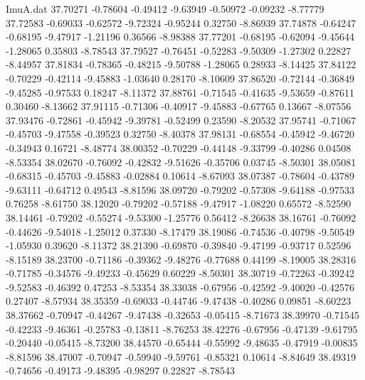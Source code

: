 \begin{filecontents}{ImuA.dat}
  37.70271   -0.78604   -0.49412   -9.63949   -0.50972   -0.09232   -8.77779
  37.72583   -0.69033   -0.62572   -9.72324   -0.95244    0.32750   -8.86939
  37.74878   -0.64247   -0.68195   -9.47917   -1.21196    0.36566   -8.98388
  37.77201   -0.68195   -0.62094   -9.45644   -1.28065    0.35803   -8.78543
  37.79527   -0.76451   -0.52283   -9.50309   -1.27302    0.22827   -8.44957
  37.81834   -0.78365   -0.48215   -9.50788   -1.28065    0.28933   -8.14425
  37.84122   -0.70229   -0.42114   -9.45883   -1.03640    0.28170   -8.10609
  37.86520   -0.72144   -0.36849   -9.45285   -0.97533    0.18247   -8.11372
  37.88761   -0.71545   -0.41635   -9.53659   -0.87611    0.30460   -8.13662
  37.91115   -0.71306   -0.40917   -9.45883   -0.67765    0.13667   -8.07556
  37.93476   -0.72861   -0.45942   -9.39781   -0.52499    0.23590   -8.20532
  37.95741   -0.71067   -0.45703   -9.47558   -0.39523    0.32750   -8.40378
  37.98131   -0.68554   -0.45942   -9.46720   -0.34943    0.16721   -8.48774
  38.00352   -0.70229   -0.44148   -9.33799   -0.40286    0.04508   -8.53354
  38.02670   -0.76092   -0.42832   -9.51626   -0.35706    0.03745   -8.50301
  38.05081   -0.68315   -0.45703   -9.45883   -0.02884    0.10614   -8.67093
  38.07387   -0.78604   -0.43789   -9.63111   -0.64712    0.49543   -8.81596
  38.09720   -0.79202   -0.57308   -9.64188   -0.97533    0.76258   -8.61750
  38.12020   -0.79202   -0.57188   -9.47917   -1.08220    0.65572   -8.52590
  38.14461   -0.79202   -0.55274   -9.53300   -1.25776    0.56412   -8.26638
  38.16761   -0.76092   -0.44626   -9.54018   -1.25012    0.37330   -8.17479
  38.19086   -0.74536   -0.40798   -9.50549   -1.05930    0.39620   -8.11372
  38.21390   -0.69870   -0.39840   -9.47199   -0.93717    0.52596   -8.15189
  38.23700   -0.71186   -0.39362   -9.48276   -0.77688    0.44199   -8.19005
  38.28316   -0.71785   -0.34576   -9.49233   -0.45629    0.60229   -8.50301
  38.30719   -0.72263   -0.39242   -9.52583   -0.46392    0.47253   -8.53354
  38.33038   -0.67956   -0.42592   -9.40020   -0.42576    0.27407   -8.57934
  38.35359   -0.69033   -0.44746   -9.47438   -0.40286    0.09851   -8.60223
  38.37662   -0.70947   -0.44267   -9.47438   -0.32653   -0.05415   -8.71673
  38.39970   -0.71545   -0.42233   -9.46361   -0.25783   -0.13811   -8.76253
  38.42276   -0.67956   -0.47139   -9.61795   -0.20440   -0.05415   -8.73200
  38.44570   -0.65444   -0.55992   -9.48635   -0.47919   -0.00835   -8.81596
  38.47007   -0.70947   -0.59940   -9.59761   -0.85321    0.10614   -8.84649
  38.49319   -0.74656   -0.49173   -9.48395   -0.98297    0.22827   -8.78543

\end{filecontents}
